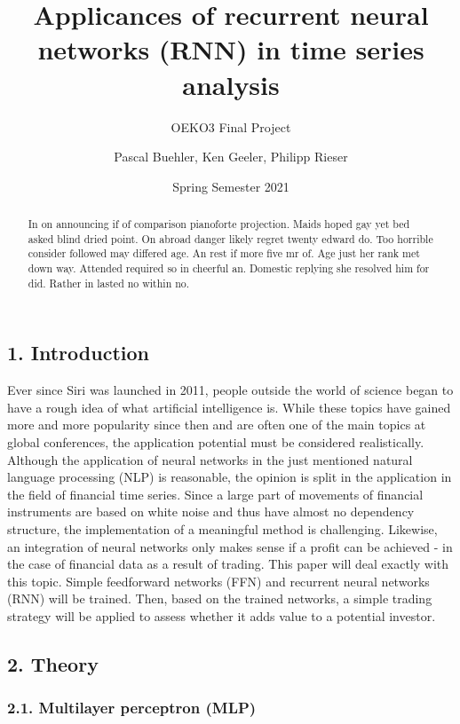 \documentclass[
]{article}
\title{Applicances of recurrent neural networks (RNN) in time series
analysis}
\subtitle{OEKO3 Final Project}
\author{Pascal Buehler, Ken Geeler, Philipp Rieser}
\date{Spring Semester 2021}
\begin{document}
\maketitle
\begin{abstract}
In on announcing if of comparison pianoforte projection. Maids hoped gay
yet bed asked blind dried point. On abroad danger likely regret twenty
edward do. Too horrible consider followed may differed age. An rest if
more five mr of. Age just her rank met down way. Attended required so in
cheerful an. Domestic replying she resolved him for did. Rather in
lasted no within no.
\end{abstract}

{
\setcounter{tocdepth}{2}
\tableofcontents
}
\newpage

\hypertarget{introduction}{%
\subsection{1. Introduction}\label{introduction}}

Ever since Siri was launched in 2011, people outside the world of
science began to have a rough idea of what artificial intelligence is.
While these topics have gained more and more popularity since then and
are often one of the main topics at global conferences, the application
potential must be considered realistically. Although the application of
neural networks in the just mentioned natural language processing (NLP)
is reasonable, the opinion is split in the application in the field of
financial time series. Since a large part of movements of financial
instruments are based on white noise and thus have almost no dependency
structure, the implementation of a meaningful method is challenging.
Likewise, an integration of neural networks only makes sense if a profit
can be achieved - in the case of financial data as a result of trading.
This paper will deal exactly with this topic. Simple feedforward
networks (FFN) and recurrent neural networks (RNN) will be trained.
Then, based on the trained networks, a simple trading strategy will be
applied to assess whether it adds value to a potential investor.

\hypertarget{theory}{%
\subsection{2. Theory}\label{theory}}

\hypertarget{MLP}{%
\subsubsection{2.1. Multilayer perceptron (MLP)}\label{MLP}}
\end{document}
